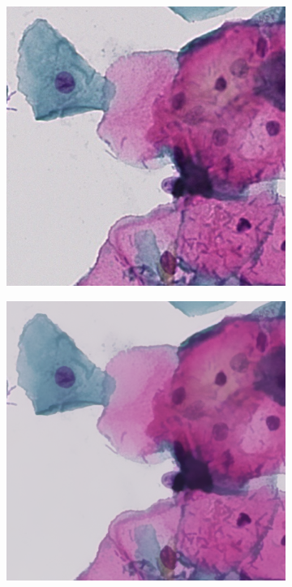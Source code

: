 \documentclass [12pt,a4paper]{report}
\begin{document}
\begin{center}
\begin{figure}[h]
\begin{subfigure}{.5\textwidth}
  \centering
  \includegraphics[scale=0.3]{microscope.eps} %
  \caption{}
\end{subfigure}%
\begin{subfigure}{.5\textwidth}
  \centering
  \includegraphics[scale=0.3]{microscope_bf_10_10.eps} %

\end{subfigure}
\end{figure}
\end{center}
\end{document}
